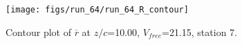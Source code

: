 \begin{figure}[H]
\centering
\texttt{[image: figs/run\_64/run\_64\_R\_contour]}
\caption{Contour plot of $\overline{r}$ at $z/c$=10.00, $V_{free}$=21.15, station 7.}
\label{fig:run_64_R_contour}
\end{figure}


